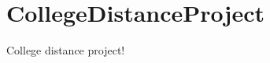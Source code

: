 \chapter{College\+Distance\+Project}
\hypertarget{md__r_e_a_d_m_e}{}\label{md__r_e_a_d_m_e}
\label{md__r_e_a_d_m_e_autotoc_md0}%
%
College distance project! 